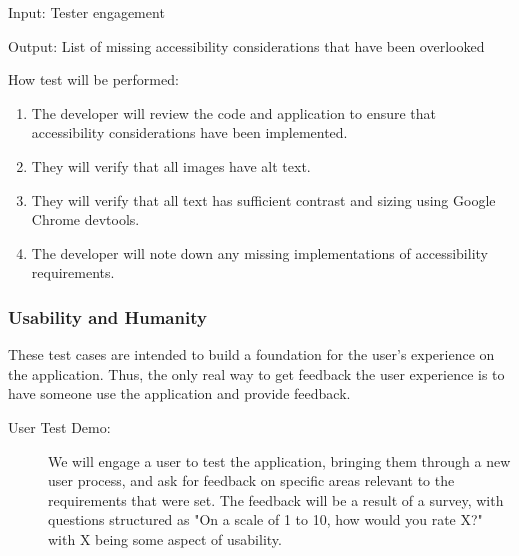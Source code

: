\documentclass[12pt, titlepage]{article}
\begin{document}
\begin{enumerate}
Input: Tester engagement
					
Output: List of missing accessibility considerations that have been overlooked
					
How test will be performed: 
\begin{enumerate}
  \item The developer will review the code and application to ensure that accessibility considerations have been implemented.
  \item They will verify that all images have alt text.
  \item They will verify that all text has sufficient contrast and sizing using Google Chrome devtools.
  \item The developer will note down any missing implementations of accessibility requirements.
\end{enumerate}

\end{enumerate}

\subsubsection{Usability and Humanity}
These test cases are intended to build a foundation for the user's experience
on the application. Thus, the only real way to get feedback the user experience
is to have someone use the application and provide feedback.

\begin{description}
  \item[User Test Demo:] We will engage a user to test the application, bringing
  them through a new user process, and ask for feedback on specific areas
  relevant to the requirements that were set. The feedback will be a result of a
  survey, with questions structured as "On a scale of 1 to 10, how would you
  rate X?" with X being some aspect of usability. 
  
\end{description}
\end{document}
